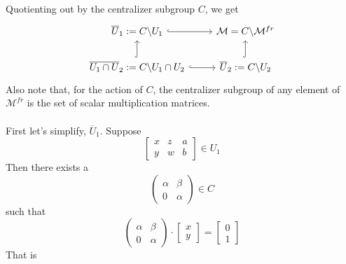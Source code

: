 \begin{example}
\begin{displaymath}
\begin{tikzcd}
\end{tikzcd} 
\end{displaymath}\\
Quotienting out by the centralizer subgroup $C$, we get
\begin{displaymath}
\begin{tikzcd}
  \overline{U}_1:=C\backslash U_1\arrow[r,hookrightarrow] & \mathcal{M}=C\backslash\mathcal{M}^{fr} \\
  \overline{U_1 \cap U}_2:=C\backslash U_1 \cap U_2 \arrow[hookrightarrow]{u} \arrow[r,hookrightarrow] & \overline{U}_2:=C\backslash U_2 \arrow[hookrightarrow]{u} 
\end{tikzcd} 
\end{displaymath}
Also note that, for the action of $C$, the centralizer subgroup of any element of $\mathcal{M}^{fr}$ is the set of scalar multiplication matrices.\\ 
\bigskip
\\
First let's simplify, $\overline{U}_1$. Suppose
\[
	\begin{bmatrix}
	x&z&a\\
	y&w&b
	\end{bmatrix}
	\in U_1
\]
Then there exists a 
\[
	\begin{pmatrix}
		\alpha & \beta\\
		0 & \alpha 
	\end{pmatrix}
	\in
	C
\]
such that
\[
	\begin{pmatrix}
		\alpha & \beta\\
		0 & \alpha 	
	\end{pmatrix}
	\cdot
	\begin{bmatrix}
		x\\
		y
	\end{bmatrix}
	=
	\begin{bmatrix}
		0\\
		1
	\end{bmatrix}	
\] 
That is 


\end{example}
